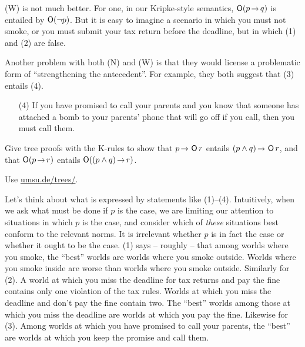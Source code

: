 (W) is not much better. For one, in our Kripke-style semantics, $\Ob(p \to q)$
is entailed by $\operatorname{\mathsf{O}}(\neg p)$. But it is easy to imagine a scenario in which you
must not smoke, or you must submit your tax return before the deadline, but in
which (1) and (2) are false.


Another problem with both (N) and (W) is that they would license a problematic
form of ``strengthening the antecedent''. For example, they both suggest that
(3)  entails (4).
\begin{itemize}[leftmargin=10mm]
\itemsep-1mm
\item[(4)] If you have promised to call your parents and you know that someone
  has attached a bomb to your parents' phone that will go off if you call, then
  you must call them.
\end{itemize}

\begin{exercise}
  Give tree proofs with the K-rules to show that $p \to \Ob r$ entails
  $(p \land q) \to \Ob r$, and that $\Ob (p \to r)$ entails
  $\Ob((p \land q) \to r)$.
\end{exercise}
\begin{solution}
  Use \href{https://www.umsu.de/trees/}{umsu.de/trees/}.
\end{solution}

Let's think about what is expressed by statements like (1)--(4). Intuitively,
when we ask what must be done if $p$ is the case, we are limiting our attention
to situations in which $p$ is the case, and consider which of \emph{these}
situations best conform to the relevant norms. It is irrelevant whether $p$ is
in fact the case or whether it ought to be the case. (1) says -- roughly -- that
among worlds where you smoke, the ``best'' worlds are worlds where you smoke
outside. Worlds where you smoke inside are worse than worlds where you smoke
outside. Similarly for (2). A world at which you miss the deadline for tax
returns and pay the fine contains only one violation of the tax rules. Worlds at
which you miss the deadline and don't pay the fine contain two. The ``best''
worlds among those at which you miss the deadline are worlds at which you pay
the fine. Likewise for (3). Among worlds at which you have promised to call your
parents, the ``best'' are worlds at which you keep the promise and call them.

